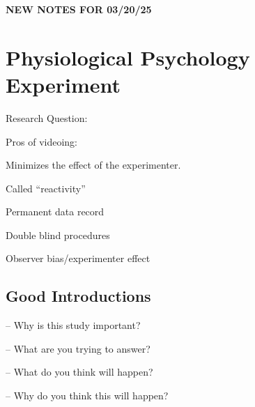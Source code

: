 \newpage

\begin{center}
    \textbf{NEW NOTES FOR 03/20/25}
\end{center}

\section{Physiological Psychology Experiment}

Research Question: 

\begin{coloredlist}
    \item Pros of videoing:
    \begin{coloredlist}
        \item Minimizes the effect of the experimenter.
        \begin{coloredlist}
            \item Called ``reactivity''
        \end{coloredlist}
        \item Permanent data record
        \item Double blind procedures
        \begin{coloredlist}
            \item Observer bias/experimenter effect
        \end{coloredlist}
    \end{coloredlist}
\end{coloredlist}

\subsection{Good Introductions}

\begin{coloredlist}
    \item {} -- Why is this study important?
    \begin{coloredlist}
        \item 
    \end{coloredlist}
    \item {} -- What are you trying to answer?
    \item {} -- What do you think will happen?
    \item {} -- Why do you think this will happen?
    \item 
\end{coloredlist}

